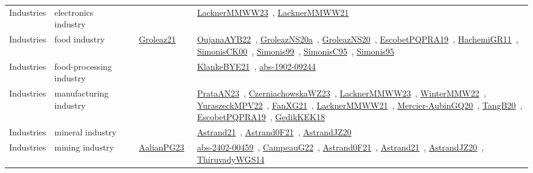 {\begin{longtable}{lp{3cm}>{\raggedright\arraybackslash}p{6cm}>{\raggedright\arraybackslash}p{6cm}>{\raggedright\arraybackslash}p{8cm}}
Industries & electronics industry &  &  & \href{works/LacknerMMWW23.pdf}{LacknerMMWW23}~\cite{LacknerMMWW23}, \href{works/LacknerMMWW21.pdf}{LacknerMMWW21}~\cite{LacknerMMWW21}\\
Industries & food industry &  & \href{works/Groleaz21.pdf}{Groleaz21}~\cite{Groleaz21} & \href{works/OujanaAYB22.pdf}{OujanaAYB22}~\cite{OujanaAYB22}, \href{works/GroleazNS20a.pdf}{GroleazNS20a}~\cite{GroleazNS20a}, \href{works/GroleazNS20.pdf}{GroleazNS20}~\cite{GroleazNS20}, \href{works/EscobetPQPRA19.pdf}{EscobetPQPRA19}~\cite{EscobetPQPRA19}, \href{works/HachemiGR11.pdf}{HachemiGR11}~\cite{HachemiGR11}, \href{works/SimonisCK00.pdf}{SimonisCK00}~\cite{SimonisCK00}, \href{works/Simonis99.pdf}{Simonis99}~\cite{Simonis99}, \href{works/SimonisC95.pdf}{SimonisC95}~\cite{SimonisC95}, \href{works/Simonis95.pdf}{Simonis95}~\cite{Simonis95}\\
Industries & food-processing industry &  &  & \href{works/KlankeBYE21.pdf}{KlankeBYE21}~\cite{KlankeBYE21}, \href{works/abs-1902-09244.pdf}{abs-1902-09244}~\cite{abs-1902-09244}\\
Industries & manufacturing industry &  &  & \href{works/PrataAN23.pdf}{PrataAN23}~\cite{PrataAN23}, \href{works/CzerniachowskaWZ23.pdf}{CzerniachowskaWZ23}~\cite{CzerniachowskaWZ23}, \href{works/LacknerMMWW23.pdf}{LacknerMMWW23}~\cite{LacknerMMWW23}, \href{works/WinterMMW22.pdf}{WinterMMW22}~\cite{WinterMMW22}, \href{works/YuraszeckMPV22.pdf}{YuraszeckMPV22}~\cite{YuraszeckMPV22}, \href{works/FanXG21.pdf}{FanXG21}~\cite{FanXG21}, \href{works/LacknerMMWW21.pdf}{LacknerMMWW21}~\cite{LacknerMMWW21}, \href{works/Mercier-AubinGQ20.pdf}{Mercier-AubinGQ20}~\cite{Mercier-AubinGQ20}, \href{works/TangB20.pdf}{TangB20}~\cite{TangB20}, \href{works/EscobetPQPRA19.pdf}{EscobetPQPRA19}~\cite{EscobetPQPRA19}, \href{works/GedikKEK18.pdf}{GedikKEK18}~\cite{GedikKEK18}\\
Industries & mineral industry &  &  & \href{works/Astrand21.pdf}{Astrand21}~\cite{Astrand21}, \href{works/Astrand0F21.pdf}{Astrand0F21}~\cite{Astrand0F21}, \href{works/AstrandJZ20.pdf}{AstrandJZ20}~\cite{AstrandJZ20}\\
Industries & mining industry &  & \href{works/AalianPG23.pdf}{AalianPG23}~\cite{AalianPG23} & \href{works/abs-2402-00459.pdf}{abs-2402-00459}~\cite{abs-2402-00459}, \href{works/CampeauG22.pdf}{CampeauG22}~\cite{CampeauG22}, \href{works/Astrand0F21.pdf}{Astrand0F21}~\cite{Astrand0F21}, \href{works/Astrand21.pdf}{Astrand21}~\cite{Astrand21}, \href{works/AstrandJZ20.pdf}{AstrandJZ20}~\cite{AstrandJZ20}, \href{works/ThiruvadyWGS14.pdf}{ThiruvadyWGS14}~\cite{ThiruvadyWGS14}\\

\end{longtable}}

